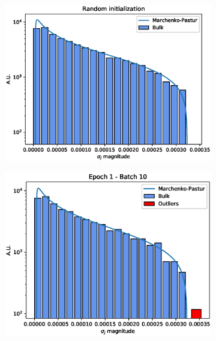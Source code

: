\documentclass[twocolumn]{article}
\begin{document}
\begin{figure}
  \centering
  \begin{subfigure}{.45\linewidth}
    \includegraphics[width=\linewidth]{mp_fit.eps}
    \caption{}
  \end{subfigure}
  \begin{subfigure}{.45\linewidth}
    \includegraphics[width=\linewidth]{sv_distr_e1_b10.eps}
    \caption{}
  \end{subfigure}\par\medskip
  \begin{subfigure}{.45\linewidth}

\end{subfigure}
\end{figure}
\end{document}

